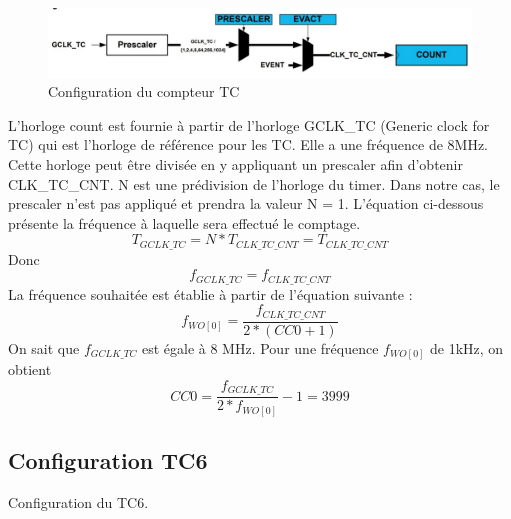 \documentclass[a4paper]{article}
\begin{document}
\begin{figure}[htbp]
\centering
\includegraphics[width=12cm]{figure/prescaler.jpg}
\caption{Configuration du compteur TC}
\label{pic3}
\end{figure}

L'horloge count est fournie à partir de l’horloge GCLK\_TC (Generic clock for TC) qui est l'horloge de référence pour les TC. Elle a une fréquence de 8MHz. Cette horloge peut être divisée en y appliquant un prescaler afin d’obtenir CLK\_TC\_CNT. N est une prédivision de l’horloge du timer. Dans notre cas, le prescaler n’est pas appliqué et prendra la valeur N = 1. L'équation ci-dessous présente la fréquence à laquelle sera effectué le comptage. \\
$$T_{GCLK\_TC} = N*T_{CLK\_TC\_CNT} = T_{CLK\_TC\_CNT}$$
Donc\\
$$f_{GCLK\_TC} = f_{CLK\_TC\_CNT}$$
La fréquence souhaitée est établie à partir de l'équation suivante :
$$f_{WO[0]} = \frac{f_{CLK\_TC\_CNT}}{2*(CC0+1)}$$
On sait que $f_{GCLK\_TC}$ est égale à 8 MHz. Pour une fréquence $f_{WO[0]}$ de 1kHz, on obtient\\
$$CC0 = \frac{f_{GCLK\_TC}}{2*f_{WO[0]}} - 1 = 3999$$
\subsection{Configuration TC6}
Configuration du TC6.



{}

\end{document}
